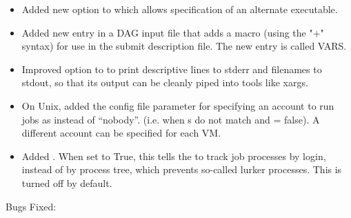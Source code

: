 \begin{itemize}
\item Added new option  to  which allows 
specification of an alternate  executable. 

\item Added new entry in a DAG input file that adds a macro (using the
"+" syntax) for use in the submit description file.  The new entry
is called VARS.

\item Improved  option to  to print
      descriptive lines to stderr and filenames to stdout, so that its
      output can be cleanly piped into tools like xargs.

\item On Unix, added the  config file parameter for
specifying an account to run jobs as instead of ``nobody''. (i.e. when
s do not match and  =
false). A different account can be specified for each VM.

\item Added . When set to True,
this tells the  to track job processes by login, instead
of by process tree, which prevents so-called lurker processes. This is
turned off by default.

\end{itemize}

\noindent Bugs Fixed:

